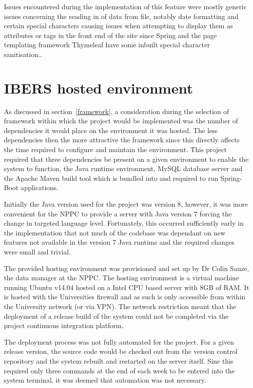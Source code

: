 \lstjava


Issues encountered during the implementation of this feature were mostly generic issues concerning the reading in of data from file, notably date formatting and certain special characters causing issues when attempting to display them as attributes or tags in the front end of the site since Spring and the page templating framework Thymeleaf have some inbuilt special character sanitisation.. 
\section{IBERS hosted environment}\label{hosting}

As discussed in section~\ref{framework}, a consideration during the selection of framework within which the project would be implemented was the number of dependencies it would place on the environment it was hosted. The less dependencies then the more attractive the framework since this directly affects the time required to configure and maintain the environment. This project required that three dependencies be present on a given environment to enable the system to function, the Java runtime environment, MySQL database server and the Apache Maven build tool which is bundled into and required to run Spring-Boot applications. 

Initially the Java version used for the project was version 8, however, it was more convenient for the NPPC to provide a server with Java version 7 forcing the change in targeted language level. Fortunately, this occurred sufficiently early in the implementation that not much of the codebase was dependant on new features not available in the version 7 Java runtime and the required changes were small and trivial.

The provided hosting environment was provisioned and set up by Dr Colin Sauze, the data manager at the NPPC. The hosting environment is a virtual machine running Ubuntu v14.04 hosted on a Intel CPU based server with 8GB of RAM. It is hosted with the Universities firewall and as such is only accessible from within the University network (or via VPN). The network restriction meant that the deployment of a release build of the system could not be completed via the project continuous integration platform. 

The deployment process was not fully automated for the project. For a given release version, the source code would be checked out from the version control repository and the system rebuilt and restarted on the server itself. Sine this required only three commands at the end of each week to be entered into the system terminal, it was deemed that automation was not necessary.
